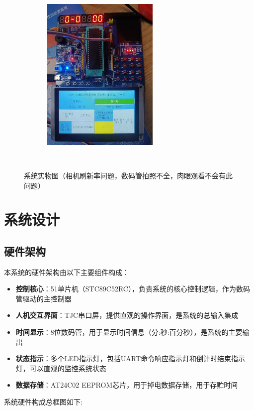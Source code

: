 \documentclass[12pt,hyperref,a4paper,UTF8]{ctexart}
\begin{document}
\begin{figure}[H] %
        \centering
        \includegraphics[width=0.50\textwidth]{figures/1.jpg} %
        \caption{系统实物图（相机刷新率问题，数码管拍照不全，肉眼观看不会有此问题）} %
        \label{fig:example} %
\end{figure}

\section{系统设计}

\subsection{硬件架构}

本系统的硬件架构由以下主要组件构成：

\begin{itemize}
  \item \textbf{控制核心}：51单片机（STC89C52RC），负责系统的核心控制逻辑，作为数码管驱动的主控制器
  \item \textbf{人机交互界面}：TJC串口屏，提供直观的操作界面，是系统的总输入集成
  \item \textbf{时间显示}：8位数码管，用于显示时间信息（分:秒:百分秒），是系统的主要输出
  \item \textbf{状态指示}：多个LED指示灯，包括UART命令响应指示灯和倒计时结束指示灯，可以直观的监控系统状态
  \item \textbf{数据存储}：AT24C02 EEPROM芯片，用于掉电数据存储，用于存贮时间
\end{itemize}

系统硬件构成总框图如下:
\end{document}
